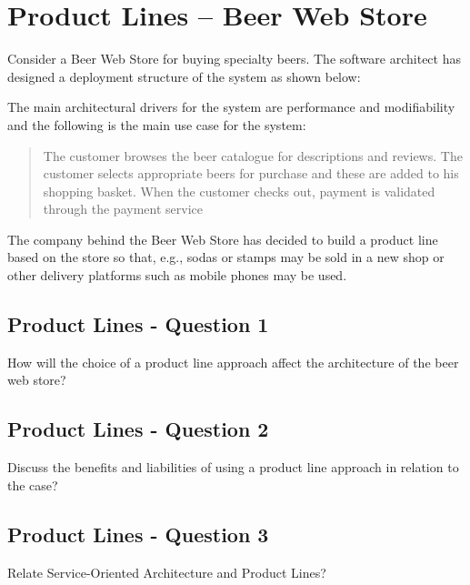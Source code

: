 \section{Product Lines -- Beer Web Store}
Consider a Beer Web Store for buying specialty beers. The software
architect has designed a deployment structure of the system as shown
below:
\begin{figure}[h!]
  \centerline{}
  \label{fig:observation}
\end{figure}
The main architectural drivers for the system are performance and
modifiability and the following is the main use case for the system:
\begin{quote}
  The customer browses the beer catalogue for descriptions and
  reviews. The customer selects appropriate beers for purchase and
  these are added to his shopping basket. When the customer checks
  out, payment is validated through the payment service
\end{quote}

The company behind the Beer Web Store has decided to build a product
line based on the store so that, e.g., sodas or stamps may be sold in
a new shop or other delivery platforms such as mobile phones may be
used.

\subsection{Product Lines - Question 1}

\begin{question}
How will the choice of a product line approach affect the
architecture of the beer web store?
\end{question}


\subsection{Product Lines - Question 2}

\begin{question}
Discuss the benefits and liabilities of using a product line
approach in relation to the case?
\end{question}


\subsection{Product Lines - Question 3}

\begin{question}
Relate Service-Oriented Architecture and Product Lines?
\end{question}


